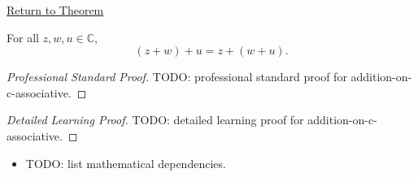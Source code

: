 \newpage
{}
\label{prf:addition-on-c-associative}

\begin{remark*}[Return]
\hyperref[thm:addition-on-c-associative]{Return to Theorem}
\end{remark*}

\begin{theorem*}
For all \(z,w,u\in\mathbb{C}\),
\[
(z+w)+u=z+(w+u).
\]
\end{theorem*}

\begin{proof}[Professional Standard Proof]
\LRAProofBodyStart
TODO: professional standard proof for addition-on-c-associative.
\end{proof}

\begin{proof}[Detailed Learning Proof]
\LRAProofBodyStart
TODO: detailed learning proof for addition-on-c-associative.
\end{proof}

\begin{remark*}
\end{remark*}

\begin{dependencies}
\begin{itemize}
  \item TODO: list mathematical dependencies.
\end{itemize}
\end{dependencies}

\clearpage
